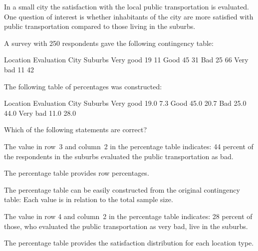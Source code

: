 
\begin{question}
In a small city the satisfaction with the local public
transportation is evaluated. One question of interest is whether
inhabitants of the city are more satisfied with public
transportation compared to those living in the suburbs.

A survey with 250 respondents gave the following contingency table:

\begin{Schunk}
\begin{Soutput}
           Location
Evaluation  City Suburbs
  Very good   19      11
  Good        45      31
  Bad         25      66
  Very bad    11      42
\end{Soutput}
\end{Schunk}

The following table of percentages was constructed:

\begin{Schunk}
\begin{Soutput}
           Location
Evaluation  City    Suburbs
  Very good    19.0     7.3
  Good         45.0    20.7
  Bad          25.0    44.0
  Very bad     11.0    28.0
\end{Soutput}
\end{Schunk}

Which of the following statements are correct?

\begin{answerlist}
  \item The value in row~3 and column~2 in the percentage table indicates: 44 percent of the respondents in the suburbs evaluated the public transportation  as bad.
  \item The percentage table provides  row percentages.
  \item The percentage table can be easily constructed from the original contingency table: Each value is in relation to the total sample size.
  \item The value in row 4 and column~2 in the percentage table indicates: 28 percent of those, who evaluated the public transportation as very bad, live in the suburbs.
  \item The percentage table provides the satisfaction distribution for each location type.
\end{answerlist}
\end{question}

